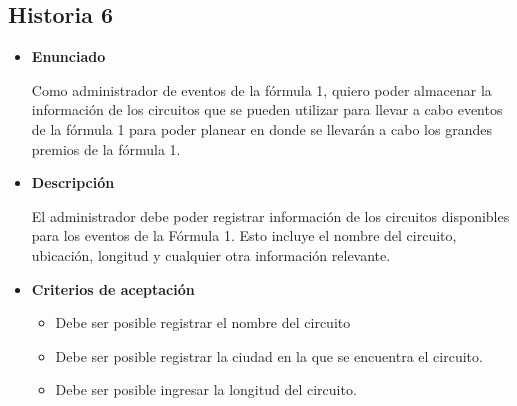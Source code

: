\documentclass{article}
\begin{document}
	\subsection{Historia 6}
	\begin{itemize}
		
		\item \large{\textbf{Enunciado}}
		\begin{description}
			Como administrador de eventos de la fórmula 1, quiero poder almacenar la información de los circuitos que se pueden utilizar para llevar a cabo eventos de la fórmula 1 para poder planear en donde se llevarán a cabo los grandes premios de la fórmula 1.
			
		\end{description}
		
		\item \large{\textbf{Descripción}}
		\begin{description}
			El administrador debe poder registrar información de los circuitos disponibles para los eventos de la Fórmula 1. Esto incluye el nombre del circuito, ubicación, longitud y cualquier otra información relevante. 
			
		\end{description}
		
		\item \large{\textbf{Criterios de aceptación}}
		\begin{itemize}
			\item Debe ser posible registrar el nombre del circuito
			\item Debe ser posible registrar la ciudad en la que se encuentra el circuito.
			\item Debe ser posible ingresar la longitud del circuito. 
			
		\end{itemize}
		
	\end{itemize}
	
\end{document}

